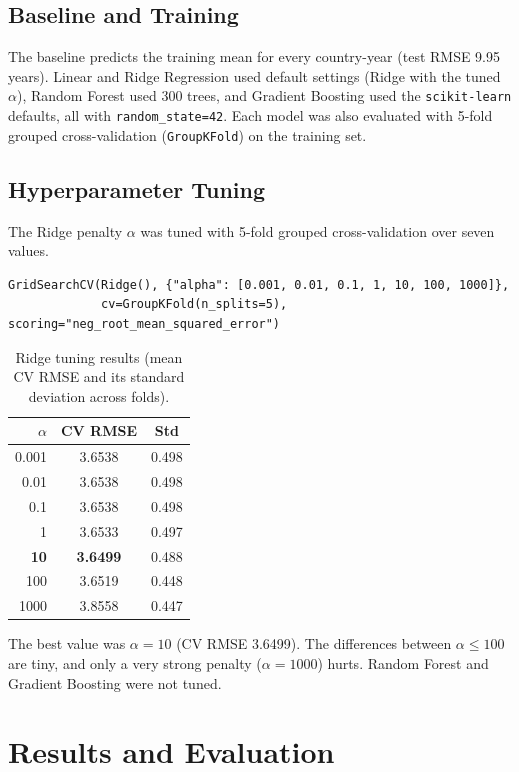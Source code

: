 \documentclass[12pt,a4paper]{article}
\begin{document}
\subsection{Baseline and Training}
The baseline predicts the training mean for every country-year (test RMSE 9.95 years). Linear and
Ridge Regression used default settings (Ridge with the tuned $\alpha$), Random Forest used 300 trees,
and Gradient Boosting used the \texttt{scikit-learn} defaults, all with \texttt{random\_state=42}.
Each model was also evaluated with 5-fold grouped cross-validation (\texttt{GroupKFold}) on the
training set.

\subsection{Hyperparameter Tuning}
The Ridge penalty $\alpha$ was tuned with 5-fold grouped cross-validation over seven values.
\begin{lstlisting}
GridSearchCV(Ridge(), {"alpha": [0.001, 0.01, 0.1, 1, 10, 100, 1000]},
             cv=GroupKFold(n_splits=5), scoring="neg_root_mean_squared_error")
\end{lstlisting}
\begin{table}[H]\centering
\caption{Ridge tuning results (mean CV RMSE and its standard deviation across folds).}
\begin{tabular}{rcc}\toprule
\textbf{$\alpha$} & \textbf{CV RMSE} & \textbf{Std}\\\midrule
0.001 & 3.6538 & 0.498\\
0.01 & 3.6538 & 0.498\\
0.1 & 3.6538 & 0.498\\
1 & 3.6533 & 0.497\\
\textbf{10} & \textbf{3.6499} & 0.488\\
100 & 3.6519 & 0.448\\
1000 & 3.8558 & 0.447\\\bottomrule
\end{tabular}\end{table}
The best value was $\alpha=10$ (CV RMSE 3.6499). The differences between $\alpha\le 100$ are tiny,
and only a very strong penalty ($\alpha=1000$) hurts. Random Forest and Gradient Boosting were not tuned.

\section{Results and Evaluation}
\end{document}
